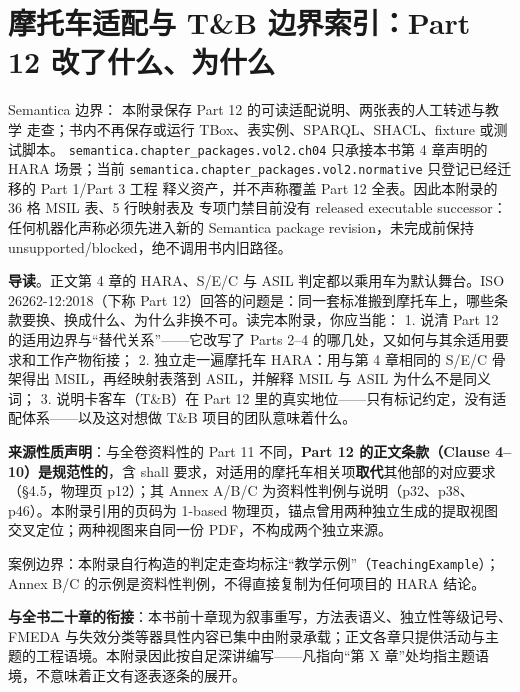 \chapter{摩托车适配与 T\&B 边界索引：Part 12 改了什么、为什么}

\begin{noteblock}
Semantica 边界： 本附录保存 Part 12 的可读适配说明、两张表的人工转述与教学
走查；书内不再保存或运行 TBox、表实例、SPARQL、SHACL、fixture 或测试脚本。
\nolinkurl{semantica.chapter_packages.vol2.ch04} 只承接本书第 4 章声明的 HARA 场景；当前
\nolinkurl{semantica.chapter_packages.vol2.normative} 只登记已经迁移的 Part 1/Part 3 工程
释义资产，并不声称覆盖 Part 12 全表。因此本附录的 36 格 MSIL 表、5 行映射表及
专项门禁目前没有 released executable successor：任何机器化声称必须先进入新的
Semantica package revision，未完成前保持 unsupported/blocked，绝不调用书内旧路径。
\end{noteblock}

\begin{noteblock}
\textbf{导读}。正文第 4 章的 HARA、S/E/C 与 ASIL 判定都以乘用车为默认舞台。ISO 26262-12:2018（下称 Part 12）回答的问题是：同一套标准搬到摩托车上，哪些条款要换、换成什么、为什么非换不可。读完本附录，你应当能：
1. 说清 Part 12 的适用边界与“替代关系”——它改写了 Parts 2–4 的哪几处，又如何与其余适用要求和工作产物衔接；
2. 独立走一遍摩托车 HARA：用与第 4 章相同的 S/E/C 骨架得出 MSIL，再经映射表落到 ASIL，并解释 MSIL 与 ASIL 为什么不是同义词；
3. 说明卡客车（T\&B）在 Part 12 里的真实地位——只有标记约定，没有适配体系——以及这对想做 T\&B 项目的团队意味着什么。

\textbf{来源性质声明}：与全卷资料性的 Part 11 不同，\textbf{Part 12 的正文条款（Clause 4–10）是规范性的}，含 shall 要求，对适用的摩托车相关项\textbf{取代}其他部的对应要求（§4.5，物理页 p12）；其 Annex A/B/C 为资料性判例与说明（p32、p38、p46）。本附录引用的页码为 1-based 物理页，锚点曾用两种独立生成的提取视图交叉定位；两种视图来自同一份 PDF，不构成两个独立来源。

案例边界：本附录自行构造的判定走查均标注“教学示例”（\nolinkurl{TeachingExample}）；Annex B/C 的示例是资料性判例，不得直接复制为任何项目的 HARA 结论。

\textbf{与全书二十章的衔接}：本书前十章现为叙事重写，方法表语义、独立性等级记号、FMEDA 与失效分类等器具性内容已集中由附录承载；正文各章只提供活动与主题的工程语境。本附录因此按自足深讲编写——凡指向“第 X 章”处均指主题语境，不意味着正文有逐表逐条的展开。
\end{noteblock}


